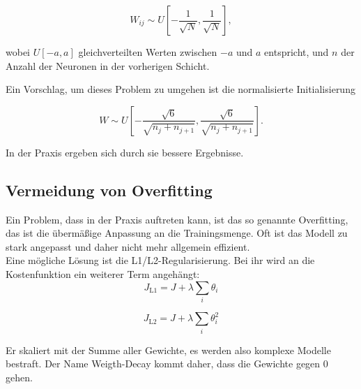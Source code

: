 \begin{equation}
	W_{ij} \sim U [ -\frac{1}{\sqrt{N}} , \frac{1}{\sqrt{N}} ],
\end{equation}

wobei $U[-a, a]$ gleichverteilten Werten zwischen $-a$ und $a$ entspricht, und $n$ der Anzahl der Neuronen in der vorherigen Schicht. 

Ein Vorschlag, um dieses Problem zu umgehen ist die normalisierte Initialisierung

\begin{equation}
	W \sim U [ - \frac{\sqrt{6}}{\sqrt{n_j+n_{j+1}}} 
	, 			 \frac{\sqrt{6}}{\sqrt{n_j+n_{j+1}}} ]. 
\end{equation}

In der Praxis ergeben sich durch sie bessere Ergebnisse. \cite{glorot2010understanding}

\subsection{Vermeidung von Overfitting}
Ein Problem, dass in der Praxis auftreten kann, ist das so genannte Overfitting, das ist die übermäßige Anpassung an die Trainingsmenge. Oft ist das Modell zu stark angepasst und daher nicht mehr allgemein effizient.\\

Eine mögliche Lösung ist die L1/L2-Regularisierung. Bei ihr wird an die Kostenfunktion ein weiterer Term angehängt:\\

\begin{equation}
	J_{\text{L1}} = J + \lambda \sum_i \theta_i 
\end{equation}

\begin{equation}
	J_{\text{L2}} = J + \lambda \sum_i \theta_i^2
\end{equation}


Er skaliert mit der Summe aller Gewichte, es werden also komplexe Modelle bestraft. Der Name Weigth-Decay kommt daher, dass die Gewichte gegen 0 gehen. \cite{Hastie2009} %
\\


